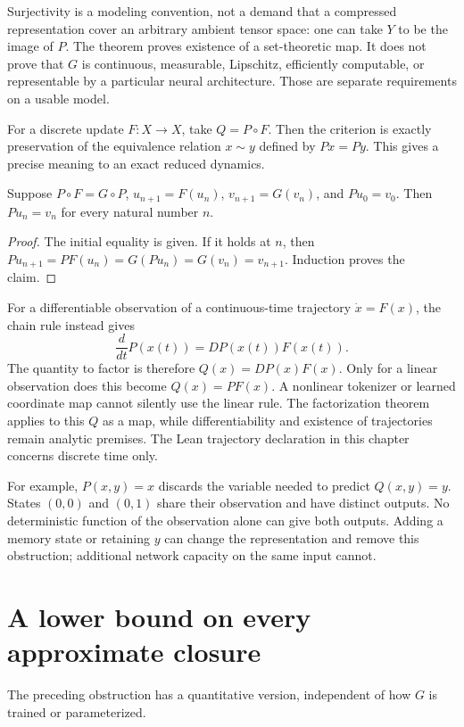 Surjectivity is a modeling convention, not a demand that a compressed
representation cover an arbitrary ambient tensor space: one can take $Y$ to
be the image of $P$. The theorem proves existence of a set-theoretic map.
It does not prove that $G$ is continuous, measurable, Lipschitz, efficiently
computable, or representable by a particular neural architecture. Those are
separate requirements on a usable model.

For a discrete update $F:X\to X$, take $Q=P\circ F$. Then the criterion
is exactly preservation of the equivalence relation $x\sim y$ defined by
$Px=Py$. This gives a precise meaning to an exact reduced dynamics.

\begin{proposition}
\label{prop:reduction-trajectory}
Suppose $P\circ F=G\circ P$, $u_{n+1}=F(u_n)$,
$v_{n+1}=G(v_n)$, and $Pu_0=v_0$. Then $Pu_n=v_n$ for every natural
number $n$.
\end{proposition}
\begin{proof}
The initial equality is given. If it holds at $n$, then
$Pu_{n+1}=PF(u_n)=G(Pu_n)=G(v_n)=v_{n+1}$. Induction proves the claim.
\end{proof}

For a differentiable observation of a continuous-time trajectory
$\dot x=F(x)$, the chain rule instead gives
\[
 \frac{d}{dt}P(x(t))=DP(x(t))F(x(t)).
\]
The quantity to factor is therefore $Q(x)=DP(x)F(x)$. Only for a linear
observation does this become $Q(x)=PF(x)$. A nonlinear tokenizer or learned
coordinate map cannot silently use the linear rule. The factorization
theorem applies to this $Q$ as a map, while differentiability and existence
of trajectories remain analytic premises. The Lean trajectory declaration
in this chapter concerns discrete time only.

For example, $P(x,y)=x$ discards the variable needed to predict $Q(x,y)=y$.
States $(0,0)$ and $(0,1)$ share their observation and have distinct outputs.
No deterministic function of the observation alone can give both outputs.
Adding a memory state or retaining $y$ can change the representation and
remove this obstruction; additional network capacity on the same input cannot.

\section{A lower bound on every approximate closure}

The preceding obstruction has a quantitative version, independent of how
$G$ is trained or parameterized.

